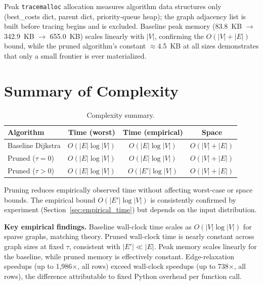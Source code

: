 \noindent Peak \texttt{tracemalloc} allocation measures algorithm data structures only (best\_costs dict, parent dict, priority-queue heap); the graph adjacency list is built before tracing begins and is excluded. Baseline peak memory (83.8~KB $\to$ 342.9~KB $\to$ 655.0~KB) scales linearly with $|V|$, confirming the $O(|V|+|E|)$ bound, while the pruned algorithm's constant $\approx$4.5~KB at all sizes demonstrates that only a small frontier is ever materialized.

\section{Summary of Complexity}

\begin{table}[htbp]
\centering
\renewcommand{\arraystretch}{1.4}
\small
\begin{tabular}{@{}lccc@{}}
\toprule
\textbf{Algorithm} & \textbf{Time (worst)} & \textbf{Time (empirical)} & \textbf{Space} \\
\midrule
Baseline Dijkstra & $O(|E|\log|V|)$ & $O(|E|\log|V|)$ & $O(|V|+|E|)$ \\
Pruned ($\tau=0$) & $O(|E|\log|V|)$ & $O(|E|\log|V|)$ & $O(|V|+|E|)$ \\
Pruned ($\tau>0$) & $O(|E|\log|V|)$ & $O(|E'|\log|V|)$ & $O(|V|+|E|)$ \\
\bottomrule
\end{tabular}
\caption[Complexity summary]{Complexity summary.}
\label{table:complexity_summary}
\end{table}

\noindent Pruning reduces empirically observed time without affecting worst-case or space bounds. The empirical bound $O(|E'|\log|V|)$ is consistently confirmed by experiment (Section~\ref{sec:empirical_time}) but depends on the input distribution.

\noindent\textbf{Key empirical findings.}
Baseline wall-clock time scales as $O(|V|\log|V|)$ for sparse graphs, matching theory. Pruned wall-clock time is nearly constant across graph sizes at fixed $\tau$, consistent with $|E'| \ll |E|$. Peak memory scales linearly for the baseline, while pruned memory is effectively constant. Edge-relaxation speedups (up to 1,986$\times$, all rows) exceed wall-clock speedups (up to 738$\times$, all rows), the difference attributable to fixed Python overhead per function call.

